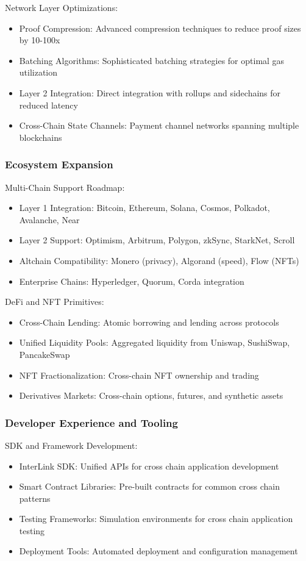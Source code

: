 \documentclass[11pt,a4paper]{article}
\begin{document}
Network Layer Optimizations:
\begin{itemize}
    \item Proof Compression: Advanced compression techniques to reduce proof sizes by 10-100x
    \item Batching Algorithms: Sophisticated batching strategies for optimal gas utilization
    \item Layer 2 Integration: Direct integration with rollups and sidechains for reduced latency
    \item Cross-Chain State Channels: Payment channel networks spanning multiple blockchains
\end{itemize}

\subsubsection{Ecosystem Expansion}

Multi-Chain Support Roadmap:
\begin{itemize}
    \item Layer 1 Integration: Bitcoin, Ethereum, Solana, Cosmos, Polkadot, Avalanche, Near
    \item Layer 2 Support: Optimism, Arbitrum, Polygon, zkSync, StarkNet, Scroll
    \item Altchain Compatibility: Monero (privacy), Algorand (speed), Flow (NFTs)
    \item Enterprise Chains: Hyperledger, Quorum, Corda integration
\end{itemize}

DeFi and NFT Primitives:
\begin{itemize}
    \item Cross-Chain Lending: Atomic borrowing and lending across protocols
    \item Unified Liquidity Pools: Aggregated liquidity from Uniswap, SushiSwap, PancakeSwap
    \item NFT Fractionalization: Cross-chain NFT ownership and trading
    \item Derivatives Markets: Cross-chain options, futures, and synthetic assets
\end{itemize}

\subsubsection{Developer Experience and Tooling}

SDK and Framework Development:
\begin{itemize}
    \item InterLink SDK: Unified APIs for cross chain application development
    \item Smart Contract Libraries: Pre-built contracts for common cross chain patterns
    \item Testing Frameworks: Simulation environments for cross chain application testing
    \item Deployment Tools: Automated deployment and configuration management
\end{itemize}
\end{document}
